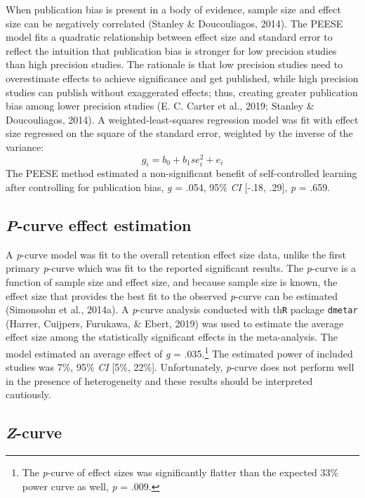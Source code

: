 \documentclass[
  english,
  man, donotrepeattitle,floatsintext]{apa7}
\begin{document}
When publication bias is present in a body of evidence, sample size and effect size can be negatively correlated (Stanley \& Doucouliagos, 2014). The PEESE model fits a quadratic relationship between effect size and standard error to reflect the intuition that publication bias is stronger for low precision studies than high precision studies. The rationale is that low precision studies need to overestimate effects to achieve significance and get published, while high precision studies can publish without exaggerated effects; thus, creating greater publication bias among lower precision studies (E. C. Carter et al., 2019; Stanley \& Doucouliagos, 2014). A weighted-least-squares regression model was fit with effect size regressed on the square of the standard error, weighted by the inverse of the variance:
\[g_{i} = b_{0} + b_{1}se_{i}^2 + e_{i}\]
The PEESE method estimated a non-significant benefit of self-controlled learning after controlling for publication bias, \emph{g} = .054, 95\% \emph{CI} {[}-.18, .29{]}, \emph{p} = .659.

\hypertarget{p-curve-effect-estimation}{%
\subsection{\texorpdfstring{\emph{P}-curve effect estimation}{P-curve effect estimation}}\label{p-curve-effect-estimation}}

A \emph{p}-curve model was fit to the overall retention effect size data, unlike the first primary \emph{p}-curve which was fit to the reported significant results. The \emph{p}-curve is a function of sample size and effect size, and because sample size is known, the effect size that provides the best fit to the observed \emph{p}-curve can be estimated (Simonsohn et al., 2014a). A \emph{p}-curve analysis conducted with th\texttt{R} package \texttt{dmetar} (Harrer, Cuijpers, Furukawa, \& Ebert, 2019) was used to estimate the average effect size among the statistically significant effects in the meta-analysis. The model estimated an average effect of \emph{g} = .035.\footnote{The \emph{p}-curve of effect sizes was significantly flatter than the expected 33\% power curve as well, \emph{p} = .009.} The estimated power of included studies was 7\%, 95\% \emph{CI} {[}5\%, 22\%{]}. Unfortunately, \emph{p}-curve does not perform well in the presence of heterogeneity and these results should be interpreted cautiously.

\hypertarget{z-curve}{%
\subsection{\texorpdfstring{\emph{Z}-curve}{Z-curve}}\label{z-curve}}
\end{document}
